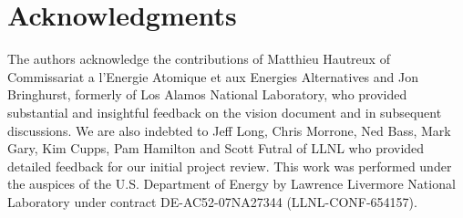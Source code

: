 \section {Acknowledgments}
The authors acknowledge the contributions of Matthieu Hautreux
of Commissariat a l'Energie Atomique et aux Energies Alternatives
and Jon Bringhurst, formerly of Los Alamos National Laboratory, who provided
substantial and insightful feedback on the \flux vision document
and in subsequent discussions.
We are also indebted to 
Jeff Long, Chris Morrone, Ned Bass,
Mark Gary, Kim Cupps, Pam Hamilton and Scott Futral
of LLNL who provided detailed feedback for our initial project review.
This work was performed under the auspices of the U.S. Department
of Energy by Lawrence Livermore National Laboratory under
contract DE-AC52-07NA27344 (LLNL-CONF-654157).

